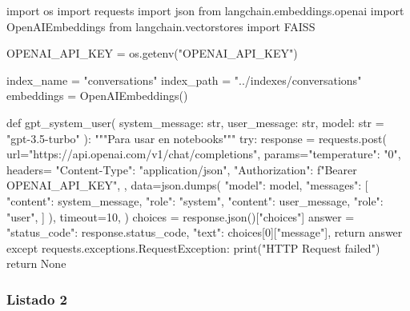 \begin{APACode}
import os
import requests
import json
from langchain.embeddings.openai import OpenAIEmbeddings
from langchain.vectorstores import FAISS

OPENAI_API_KEY = os.getenv("OPENAI_API_KEY")

index_name = "conversations"
index_path = "../indexes/conversations"
embeddings = OpenAIEmbeddings()

def gpt_system_user(
    system_message: str, user_message: str, model: str = "gpt-3.5-turbo"
):
    """Para usar en notebooks"""
    try:
        response = requests.post(
            url="https://api.openai.com/v1/chat/completions",
            params={"temperature": "0"},
            headers={
                "Content-Type": "application/json",
                "Authorization": f"Bearer {OPENAI_API_KEY}",
            },
            data=json.dumps({
                "model": model,
                "messages": [
                    {"content": system_message, "role": "system"},
                    {"content": user_message, "role": "user"},
                ]
            }),
            timeout=10,
        )
        choices = response.json()["choices"]
        answer = {
            "status_code": response.status_code,
            "text": choices[0]["message"],
        }
        return answer
    except requests.exceptions.RequestException:
        print("HTTP Request failed")
        return None
\end{APACode}

\subsubsection{Listado 2}
\label{anexo:code-4-1-15-2}

